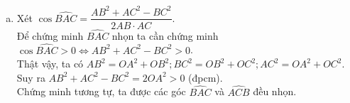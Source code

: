\begin{bt}
{\begin{enumerate}[a)]
			Trong $\triangle OBC$ vuông tại $O$, ta có $\dfrac{1}{OK^2}=\dfrac{1}{OB^2}+\dfrac{1}{OC^2}$.\hfill$(5)$\\
			Trong $\triangle OAK$ vuông tại $O$, ta có $\dfrac{1}{OH^2}=\dfrac{1}{OA^2}+\dfrac{1}{OK^2}$.\hfill$(6)$\\
			Từ $(5)$ và $(6)$, suy ra $\dfrac{1}{OH^2}=\dfrac{1}{OA^2}+\dfrac{1}{OB^2}+\dfrac{1}{OC^2}$.
			\item Xét $\cos \widehat{BAC}=\dfrac{AB^2+AC^2-BC^2}{2AB\cdot AC}$. \\
			Để chứng minh $\widehat{BAC}$ nhọn ta cần chứng minh $\cos \widehat{BAC}>0 \Leftrightarrow AB^2+AC^2-BC^2>0$. \\
			Thật vậy, ta có $AB^2=OA^2+OB^2;BC^2=OB^2+OC^2;AC^2=OA^2+OC^2$. \\
			Suy ra $AB^2+AC^2-BC^2=2OA^2>0$ (đpcm). \\
			Chứng minh tương tự, ta được các góc $\widehat{BAC}$ và $\widehat{ACB}$ đều nhọn.
	\end{enumerate}}
\end{bt}

